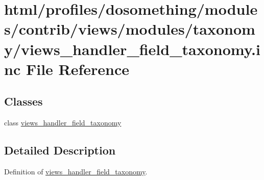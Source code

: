 \hypertarget{views__handler__field__taxonomy_8inc}{
\section{html/profiles/dosomething/modules/contrib/views/modules/taxonomy/views\_\-handler\_\-field\_\-taxonomy.inc File Reference}
\label{views__handler__field__taxonomy_8inc}
}
\subsection*{Classes}
\begin{DoxyCompactItemize}
\item 
class \hyperlink{classviews__handler__field__taxonomy}{views\_\-handler\_\-field\_\-taxonomy}
\end{DoxyCompactItemize}


\subsection{Detailed Description}
Definition of \hyperlink{classviews__handler__field__taxonomy}{views\_\-handler\_\-field\_\-taxonomy}. 